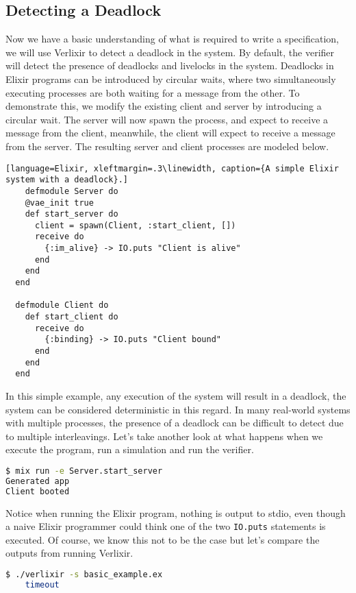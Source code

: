 \subsection{Detecting a Deadlock} \label{sec:deadlock}
Now we have a basic understanding of what is required to write a specification, we will use Verlixir to detect a deadlock in the system. By default, the verifier will detect the presence of deadlocks and livelocks in the system. Deadlocks in Elixir programs can be introduced by circular waits, where two simultaneously executing processes are both waiting for a message from the other. To demonstrate this, we modify the existing client and server by introducing a circular wait. The server will now spawn the process, and expect to receive a message from the client, meanwhile, the client will expect to receive a message from the server. The resulting server and client processes are modeled below.
\begin{lstlisting}[language=Elixir, xleftmargin=.3\linewidth, caption={A simple Elixir system with a deadlock}.]
    defmodule Server do
    @vae_init true
    def start_server do
      client = spawn(Client, :start_client, [])
      receive do
        {:im_alive} -> IO.puts "Client is alive"
      end
    end
  end
  
  defmodule Client do
    def start_client do
      receive do
        {:binding} -> IO.puts "Client bound"
      end
    end
  end  
\end{lstlisting}
In this simple example, any execution of the system will result in a deadlock, the system can be considered deterministic in this regard. In many real-world systems with multiple processes, the presence of a deadlock can be difficult to detect due to multiple interleavings. Let's take another look at what happens when we execute the program, run a simulation and run the verifier.
\begin{lstlisting}[language=bash, xleftmargin=.3\linewidth]
$ mix run -e Server.start_server
Generated app
Client booted

\end{lstlisting}
Notice when running the Elixir program, nothing is output to stdio, even though a naive Elixir programmer could think one of the two \texttt{IO.puts} statements is executed. Of course, we know this not to be the case but let's compare the outputs from running Verlixir.
\begin{lstlisting}[language=bash, xleftmargin=.3\linewidth]
    $ ./verlixir -s basic_example.ex
    timeout
\end{lstlisting}
